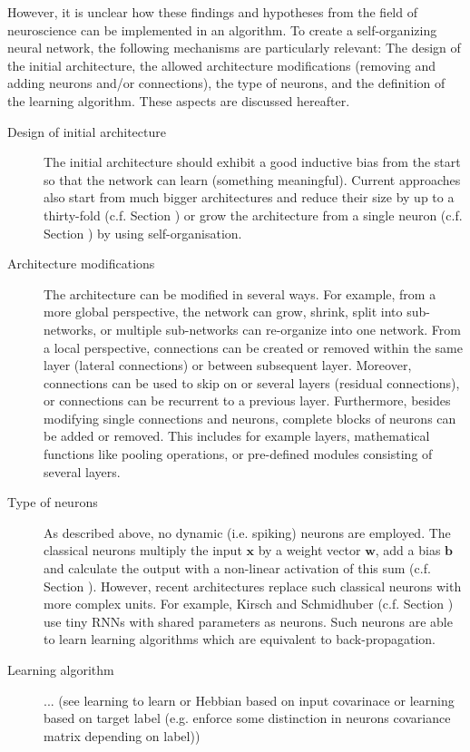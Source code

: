 However, it is unclear how these findings and hypotheses from the field of neuroscience can be implemented in an algorithm.
To create a self-organizing neural network, the following mechanisms are particularly relevant: The design of the initial architecture, the allowed architecture modifications (removing and adding neurons and/or connections), the type of neurons, and the definition of the learning algorithm.
These aspects are discussed hereafter.

\begin{description}
   \item[Design of initial architecture] The initial architecture should exhibit a good inductive bias from the start so that the network can learn (something meaningful). Current approaches also start from much bigger architectures and reduce their size by up to a thirty-fold  (c.f. Section ) or grow the architecture from a single neuron  (c.f. Section ) by using self-organisation.
   \item[Architecture modifications] The architecture can be modified in several ways. For example, from a more global perspective, the network can grow, shrink, split into sub-networks, or multiple sub-networks can re-organize into one network. From a local perspective, connections can be created or removed within the same layer (lateral connections) or between subsequent layer. Moreover, connections can be used to skip on or several layers (residual connections), or connections can be recurrent to a previous layer. Furthermore, besides modifying single connections and neurons, complete blocks of neurons can be added or removed. This includes for example layers, mathematical functions like pooling operations, or pre-defined modules consisting of several layers.
   \item[Type of neurons] As described above, no dynamic (i.e. spiking) neurons are employed. The classical neurons multiply the input \(\boldsymbol{x}\) by a weight vector \(\boldsymbol{w}\), add a bias \(\boldsymbol{b}\) and calculate the output with a non-linear activation of this sum (c.f. Section ). However, recent architectures replace such classical neurons with more complex units. For example, Kirsch and Schmidhuber  (c.f. Section ) use tiny RNNs with shared parameters as neurons. Such neurons are able to learn learning algorithms which are equivalent to back-propagation.
   \item[Learning algorithm] ... (see learning to learn or Hebbian based on input covarinace or learning based on target label (e.g. enforce some distinction in neurons covariance matrix depending on label))
\end{description}

